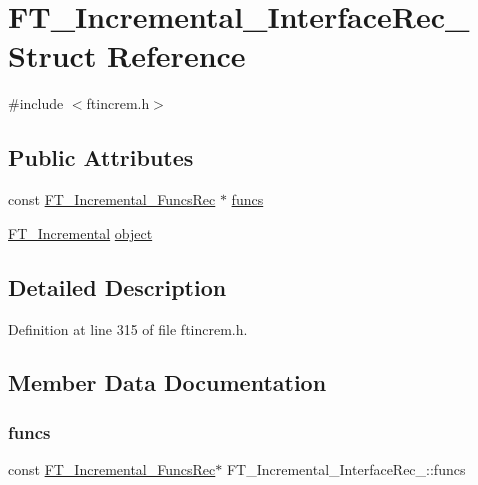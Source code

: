 \hypertarget{struct_f_t___incremental___interface_rec__}{}\section{F\+T\+\_\+\+Incremental\+\_\+\+Interface\+Rec\+\_\+ Struct Reference}
\label{struct_f_t___incremental___interface_rec__}


{\ttfamily \#include $<$ftincrem.\+h$>$}

\subsection*{Public Attributes}
\begin{DoxyCompactItemize}
\item 
const \mbox{\hyperlink{ftincrem_8h_ad771ba070b5075413589049634803c8e}{F\+T\+\_\+\+Incremental\+\_\+\+Funcs\+Rec}} $\ast$ \mbox{\hyperlink{struct_f_t___incremental___interface_rec___acd254ae2bdd80b4c9218a484c6bc2a41}{funcs}}
\item 
\mbox{\hyperlink{ftincrem_8h_a2ec8ac9cacdca1f493e4c3c5d27ed3c4}{F\+T\+\_\+\+Incremental}} \mbox{\hyperlink{struct_f_t___incremental___interface_rec___ae4f527f53465ff84ad01b484fe721a88}{object}}
\end{DoxyCompactItemize}


\subsection{Detailed Description}


Definition at line 315 of file ftincrem.\+h.



\subsection{Member Data Documentation}
\mbox{\label{struct_f_t___incremental___interface_rec___acd254ae2bdd80b4c9218a484c6bc2a41}} 
\subsubsection{\texorpdfstring{funcs}{funcs}}
{\footnotesize\ttfamily const \mbox{\hyperlink{ftincrem_8h_ad771ba070b5075413589049634803c8e}{F\+T\+\_\+\+Incremental\+\_\+\+Funcs\+Rec}}$\ast$ F\+T\+\_\+\+Incremental\+\_\+\+Interface\+Rec\+\_\+\+::funcs}



